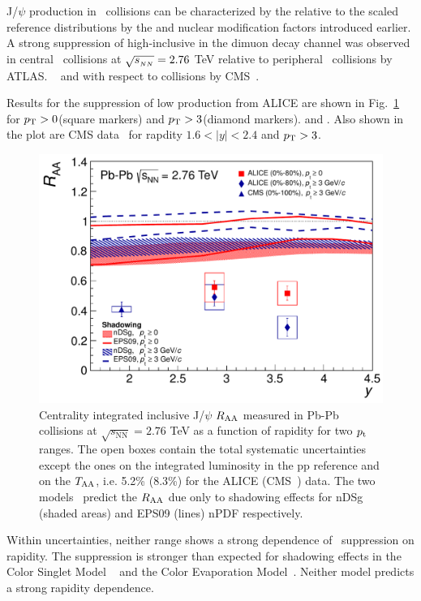 J/$\psi$ production in \PbPb\ collisions can be characterized by the relative to the \Ncoll scaled reference 
distributions by the \Rcp and \Raa nuclear modification factors introduced earlier.
A strong suppression of high-\pt inclusive \jpsi in the dimuon decay channel was observed in central \PbPb\ collisions
at $\sqrt{s_{_{NN}}} = 2.76$ TeV  relative to peripheral \PbPb\ collisions by ATLAS.
~\cite{Aad:2010aa} and with respect to \pp collisions by CMS~\cite{Chatrchyan:2012np}.

Results for the suppression of low \pt \jpsi production from ALICE are shown 
in Fig.~\ref{fig:GR:raavsy} for $p_{\rm{T}} > 0$\GeVc (square markers) and 
$p_{\rm{T}} > 3$\GeVc (diamond markers). and . Also shown in the plot are CMS data~\cite{Chatrchyan:2012np} 
for rapdity $ 1.6 < |y| < 2.4 $ and $p_{\rm{T}} > 3$\GeVc. 

\begin{figure}
\begin{center}
\includegraphics[width=0.49\linewidth]{qqbarfigures/RAAvsY_v7-eps-converted-to.pdf}
\caption{ \label{fig:GR:raavsy}  Centrality integrated inclusive J/$\psi$ $R_{\rm{AA}}$ measured in Pb-Pb
collisions at $\sqrt{s_{\mathrm{NN}}} = 2.76$ TeV as a function of  rapidity  for two $p_{\rm{t}}$ ranges.
The open boxes contain the total systematic uncertainties except the ones on the integrated luminosity in the pp reference
 and on the $T_{\rm{AA}}$, i.e.  5.2\% (8.3\%) for the  ALICE (CMS~\cite{Chatrchyan:2012np}) data.
The two models~\cite{Ferreiro:2011rw,Vogt:2010aa} predict the  $R_{\rm{AA}}$  due  only to shadowing effects
for  nDSg (shaded areas) and EPS09 (lines) nPDF respectively.}
\end{center}
\end{figure}

Within uncertainties, neither \pt range shows a strong dependence of \jpsi\ suppression on rapidity. 
The suppression is stronger than expected for shadowing effects in the Color Singlet Model
~\cite{Ferreiro:2011rw} and the Color Evaporation Model~\cite{Vogt:2010aa}. Neither model
predicts a strong rapidity dependence.

